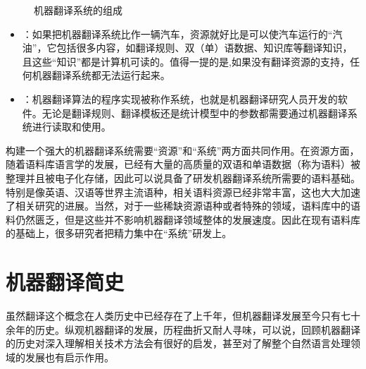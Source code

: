 \begin{figure}[htp]
    \centering

    \caption{机器翻译系统的组成}
    \label{fig:1-2}
\end{figure}

\begin{itemize}
\vspace{0.5em}
\item {\small{}}：如果把机器翻译系统比作一辆汽车，资源就好比是可以使汽车运行的“汽油”，它包括很多内容，如翻译规则、双（单）语数据、知识库等翻译知识，且这些“知识”都是计算机可读的。值得一提的是,如果没有翻译资源的支持，任何机器翻译系统都无法运行起来。
\vspace{0.5em}
\item {\small{}}：机器翻译算法的程序实现被称作系统，也就是机器翻译研究人员开发的软件。无论是翻译规则、翻译模板还是统计模型中的参数都需要通过机器翻译系统进行读取和使用。
\vspace{0.5em}
\end{itemize}

\parinterval 构建一个强大的机器翻译系统需要“资源”和“系统”两方面共同作用。在资源方面，随着语料库语言学的发展，已经有大量的高质量的双语和单语数据（称为语料）被整理并且被电子化存储，因此可以说具备了研发机器翻译系统所需要的语料基础。特别是像英语、汉语等世界主流语种，相关语料资源已经非常丰富，这也大大加速了相关研究的进展。当然，对于一些稀缺资源语种或者特殊的领域，语料库中的语料仍然匮乏，但是这些并不影响机器翻译领域整体的发展速度。因此在现有语料库的基础上，很多研究者把精力集中在“系统”研发上。


\sectionnewpage
\section{机器翻译简史}

\parinterval 虽然翻译这个概念在人类历史中已经存在了上千年，但机器翻译发展至今只有七十余年的历史。纵观机器翻译的发展，历程曲折又耐人寻味，可以说，回顾机器翻译的历史对深入理解相关技术方法会有很好的启发，甚至对了解整个自然语言处理领域的发展也有启示作用。


